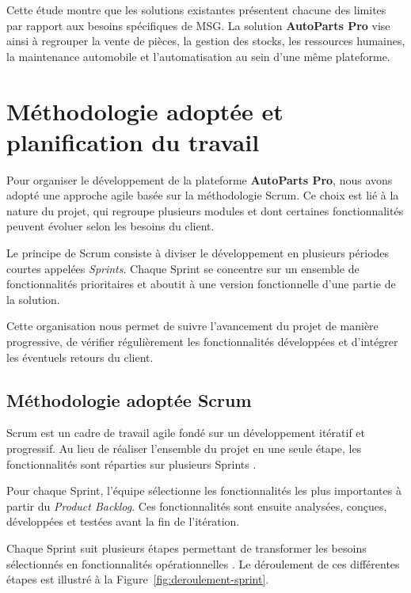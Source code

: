 Cette étude montre que les solutions existantes présentent chacune des limites par rapport aux besoins spécifiques de MSG. La solution \textbf{AutoParts Pro} vise ainsi à regrouper la vente de pièces, la gestion des stocks, les ressources humaines, la maintenance automobile et l'automatisation au sein d'une même plateforme.




\section{Méthodologie adoptée et planification du travail}

Pour organiser le développement de la plateforme \textbf{AutoParts Pro}, nous avons adopté une approche agile basée sur la méthodologie Scrum. Ce choix est lié à la nature du projet, qui regroupe plusieurs modules et dont certaines fonctionnalités peuvent évoluer selon les besoins du client.

Le principe de Scrum consiste à diviser le développement en plusieurs périodes courtes appelées \textit{Sprints}. Chaque Sprint se concentre sur un ensemble de fonctionnalités prioritaires et aboutit à une version fonctionnelle d'une partie de la solution.

Cette organisation nous permet de suivre l'avancement du projet de manière progressive, de vérifier régulièrement les fonctionnalités développées et d'intégrer les éventuels retours du client.


\subsection{Méthodologie adoptée Scrum}

Scrum est un cadre de travail agile fondé sur un développement itératif et progressif. Au lieu de réaliser l'ensemble du projet en une seule étape, les fonctionnalités sont réparties sur plusieurs Sprints \cite{scrumGuide2020}.

Pour chaque Sprint, l'équipe sélectionne les fonctionnalités les plus importantes à partir du \textit{Product Backlog}. Ces fonctionnalités sont ensuite analysées, conçues, développées et testées avant la fin de l'itération.

Chaque Sprint suit plusieurs étapes permettant de transformer les besoins sélectionnés en fonctionnalités opérationnelles \cite{scrumGuide2020}. Le déroulement de ces différentes étapes est illustré à la Figure~\ref{fig:deroulement-sprint}.

